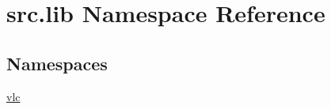 \hypertarget{namespacesrc_1_1lib}{}\section{src.\+lib Namespace Reference}
\label{namespacesrc_1_1lib}
\subsection*{Namespaces}
\begin{DoxyCompactItemize}
\item 
 \hyperlink{namespacesrc_1_1lib_1_1vlc}{vlc}
\end{DoxyCompactItemize}
